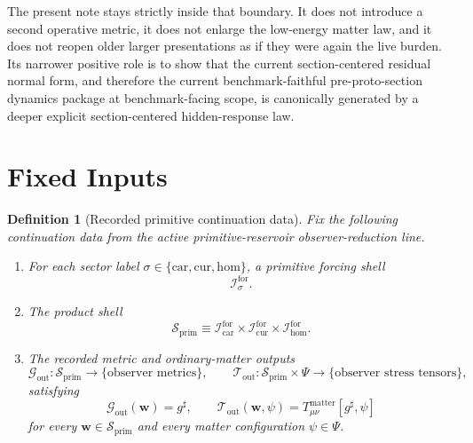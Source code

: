 \documentclass[11pt]{article}
\newcommand{\CompletedMetric}{g^{\sharp}}
\newcommand{\MatterSpace}{\Psi}
\newcommand{\Car}{\mathrm{car}}
\newcommand{\Cur}{\mathrm{cur}}
\newcommand{\Hom}{\mathrm{hom}}
\newcommand{\ForSpace}[1]{\mathcal I_{#1}^{\mathrm{for}}}
\newcommand{\PrimShell}{\mathcal S_{\mathrm{prim}}}
\newcommand{\MetricOut}{\mathscr G_{\mathrm{out}}}
\newcommand{\MatterOut}{\mathscr T_{\mathrm{out}}}
\newtheorem{definition}{Definition}
\begin{document}
The present note stays strictly inside that boundary. It does not introduce a second operative metric, it does not enlarge the low-energy matter law, and it does not reopen older larger presentations as if they were again the live burden. Its narrower positive role is to show that the current section-centered residual normal form, and therefore the current benchmark-faithful pre-proto-section dynamics package at benchmark-facing scope, is canonically generated by a deeper explicit section-centered hidden-response law.

\section{Fixed Inputs}

\begin{definition}[Recorded primitive continuation data]
\label{def:fixed}
Fix the following continuation data from the active primitive-reservoir observer-reduction line.
\begin{enumerate}
    \item For each sector label \(\sigma\in\{\Car,\Cur,\Hom\}\), a primitive forcing shell
    \[
    \ForSpace{\sigma}.
    \]
    \item The product shell
    \[
    \PrimShell
    \equiv
    \ForSpace{\Car}\times \ForSpace{\Cur}\times \ForSpace{\Hom}.
    \]
    \item The recorded metric and ordinary-matter outputs
    \[
    \MetricOut:\PrimShell\to\{\text{observer metrics}\},
    \qquad
    \MatterOut:\PrimShell\times\MatterSpace\to\{\text{observer stress tensors}\},
    \]
    satisfying
    \begin{equation}
    \MetricOut(\mathbf w)=\CompletedMetric,
    \qquad
    \MatterOut(\mathbf w,\psi)
    =
    T_{\mu\nu}^{\mathrm{matter}}[\CompletedMetric,\psi]
    \label{eq:fixedoutputs}
    \end{equation}
    for every \(\mathbf w\in\PrimShell\) and every matter configuration \(\psi\in\MatterSpace\).
\end{enumerate}
\end{definition}
\end{document}
